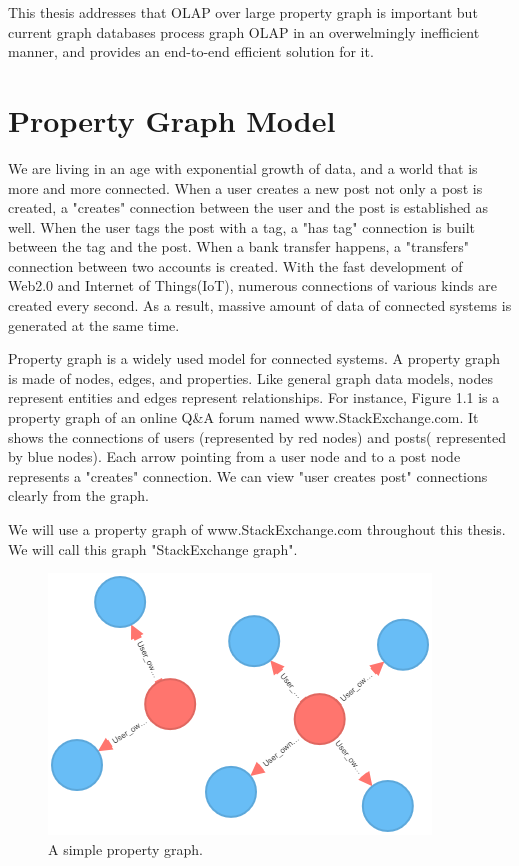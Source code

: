 
This thesis addresses that OLAP over large property graph is important but current graph databases process graph OLAP in an overwelmingly inefficient manner, and provides an end-to-end efficient solution for it.

\section{Property Graph Model}

We are living in an age with exponential growth of data, and a world that is more and more connected. When a user creates a new post not only a post is created,  a "creates" connection between the user and the post is established as well. When the user tags the post with a tag, a "has tag" connection is built between the tag and the post. When a bank transfer happens, a "transfers" connection between two accounts is created. With the fast development of Web2.0 and Internet of Things(IoT), numerous connections of various kinds are created every second. As a result, massive amount of data of connected systems is generated at the same time. 

Property graph is a widely used model for connected systems. A property graph is made of nodes, edges, and properties. Like general graph data models, nodes represent entities and edges represent relationships. For instance, Figure 1.1 is a property graph of an online Q\&A forum named www.StackExchange.com. It shows the connections of users (represented by red nodes) and posts( represented by blue nodes). Each arrow pointing from a user node and to a post node represents a "creates" connection. We can view "user creates post" connections clearly from the graph. 

We will use a property graph of www.StackExchange.com throughout this thesis. We will call this graph "StackExchange graph". 


\begin {figure}[H]
\centering
\includegraphics[scale=0.7]{pic/11.png}
\caption{A simple property graph.}
\end{figure}


